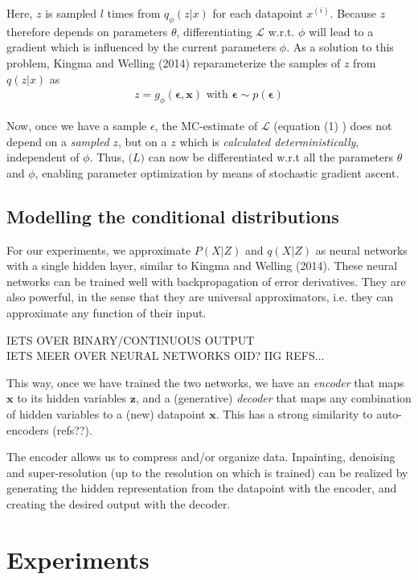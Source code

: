 \documentclass{article}
\begin{document}
Here, $z$ is sampled $l$ times from $q_{\phi}(z|x)$ for each datapoint $x^{(i)}$. Because $z$ therefore depends on parameters $\theta$, differentiating $\mathcal{L}$ w.r.t. $\phi$ will lead to a gradient which is influenced by the current parameters $\phi$. 
As a solution to this problem, Kingma and Welling (2014) reparameterize the samples of $z$ from $q(z|x)$ as
\begin{align}
z = g_\phi(\mathbf{\epsilon},\mathbf{x}) \text{  with  } \mathbf{\epsilon} \sim p(\mathbf{\epsilon}) 
\end{align} 

Now, once we have a sample $\epsilon$, the MC-estimate of $\mathcal{L}$ (equation (1) ) does not depend on a \textit{sampled} $z$, but on a  $z$ which is \textit{calculated deterministically}, independent of $\phi$. Thus, $\mathcal(L)$ can now be differentiated w.r.t all the parameters $\theta$ and $\phi$, enabling parameter optimization by means of stochastic gradient ascent.

\subsection{Modelling the conditional distributions}

For our experiments, we approximate $P(X|Z)$ and $q(X|Z)$ as neural networks with a single hidden layer, similar to Kingma and Welling (2014). These neural networks can be trained well with backpropagation of error derivatives. They are also powerful, in the sense that they are universal approximators, i.e. they can approximate any function of their input. 

IETS OVER BINARY/CONTINUOUS OUTPUT \\
IETS MEER OVER NEURAL NETWORKS OID? IIG REFS...

This way, once we have trained the two networks, we have an \textit{encoder} that maps $\mathbf{x}$ to its hidden variables $\mathbf{z}$, and a (generative) \textit{decoder} that maps any combination of hidden variables to a (new) datapoint $\mathbf{x}$. This has a strong similarity to auto-encoders (refs??). 

The encoder allows us to compress and/or organize data. Inpainting, denoising and super-resolution (up to the resolution on which is trained) can be realized by generating the hidden representation from the datapoint with the encoder, and creating the desired output with the decoder.

\section{Experiments}
\end{document}
